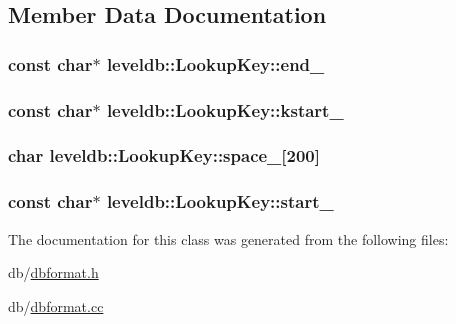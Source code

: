 \subsection{Member Data Documentation}
\hypertarget{classleveldb_1_1_lookup_key_aff523de430eb2a286884612b19eb8023}{}
\subsubsection[{end\+\_\+}]{\setlength{\rightskip}{0pt plus 5cm}const char$\ast$ leveldb\+::\+Lookup\+Key\+::end\+\_\+\hspace{0.3cm}{\ttfamily [private]}}\label{classleveldb_1_1_lookup_key_aff523de430eb2a286884612b19eb8023}
\hypertarget{classleveldb_1_1_lookup_key_a7568f0423d181c4164400acccfafd710}{}
\subsubsection[{kstart\+\_\+}]{\setlength{\rightskip}{0pt plus 5cm}const char$\ast$ leveldb\+::\+Lookup\+Key\+::kstart\+\_\+\hspace{0.3cm}{\ttfamily [private]}}\label{classleveldb_1_1_lookup_key_a7568f0423d181c4164400acccfafd710}
\hypertarget{classleveldb_1_1_lookup_key_a96b495591054b9b7d8fbc1c393c97ac9}{}
\subsubsection[{space\+\_\+}]{\setlength{\rightskip}{0pt plus 5cm}char leveldb\+::\+Lookup\+Key\+::space\+\_\+\mbox{[}200\mbox{]}\hspace{0.3cm}{\ttfamily [private]}}\label{classleveldb_1_1_lookup_key_a96b495591054b9b7d8fbc1c393c97ac9}
\hypertarget{classleveldb_1_1_lookup_key_aa03e702970f32dd5629838cbac3b9ded}{}
\subsubsection[{start\+\_\+}]{\setlength{\rightskip}{0pt plus 5cm}const char$\ast$ leveldb\+::\+Lookup\+Key\+::start\+\_\+\hspace{0.3cm}{\ttfamily [private]}}\label{classleveldb_1_1_lookup_key_aa03e702970f32dd5629838cbac3b9ded}


The documentation for this class was generated from the following files\+:\begin{DoxyCompactItemize}
\item 
db/\hyperlink{dbformat_8h}{dbformat.\+h}\item 
db/\hyperlink{dbformat_8cc}{dbformat.\+cc}\end{DoxyCompactItemize}

